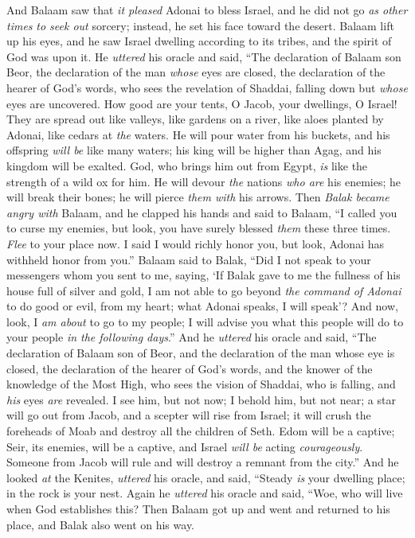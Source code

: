 \begin{biblechapter} %
 And Balaam saw that \textit{it pleased} Adonai to bless Israel, and he did not go \textit{as other times} \textit{to seek out} sorcery; instead, he set his face toward the desert.
\verse Balaam lift up his eyes, and he saw Israel dwelling according to its tribes, and the spirit of God was upon it.
\verse He \textit{uttered} his oracle and said,
\verse “The declaration of Balaam son Beor, 
the declaration of the man \textit{whose} eyes are closed,
\verse the declaration of the hearer of God’s words, 
who sees the revelation of Shaddai, 
falling down but \textit{whose} eyes are uncovered.
\verse How good are your tents, O Jacob, 
your dwellings, O Israel!
\verse They are spread out like valleys, 
like gardens on a river, 
like aloes planted by Adonai, 
like cedars at \textit{the} waters.
\verse He will pour water from his buckets, 
and his offspring \textit{will be} like many waters; 
his king will be higher than Agag, 
and his kingdom will be exalted.
\verse God, who brings him out from Egypt, 
\textit{is} like the strength of a wild ox for him. 
He will devour \textit{the} nations \textit{who are} his enemies; 
he will break their bones; 
he will pierce \textit{them with} his arrows.
\verse Then \textit{Balak became angry with} Balaam, and he clapped his hands and said to Balaam, “I called you to curse my enemies, but look, you have surely blessed \textit{them} these three times.
\verse \textit{Flee} to your place now. I said I would richly honor you, but look, Adonai has withheld honor from you.”
\verse Balaam said to Balak, “Did I not speak to your messengers whom you sent to me, saying,
\verse ‘If Balak gave to me the fullness of his house full of silver and gold, I am not able to go beyond \textit{the command of Adonai} to do good or evil, from my heart; what Adonai speaks, I will speak’?
\verse And now, look, I \textit{am about} to go to my people; I will advise you what this people will do to your people \textit{in the following days}.”
\verse And he \textit{uttered} his oracle and said,
\verse “The declaration of Balaam son of Beor, 
and the declaration of the man whose eye is closed,
\verse the declaration of the hearer of God’s words, 
and the knower of the knowledge of the Most High, 
who sees the vision of Shaddai, 
who is falling, and \textit{his} eyes \textit{are} revealed.
\verse I see him, but not now; 
I behold him, but not near; 
a star will go out from Jacob, 
and a scepter will rise from Israel; 
it will crush the foreheads of Moab 
and destroy all the children of Seth.
\verse Edom will be a captive; 
Seir, its enemies, will be a captive, 
and Israel \textit{will be} acting \textit{courageously}.
\verse Someone from Jacob will rule 
and will destroy a remnant from the city.”
\verse And he looked \textit{at} the Kenites, \textit{uttered} his oracle, and said,
\verse “Steady \textit{is} your dwelling place; 
in the rock is your nest.
\verse Again he \textit{uttered} his oracle and said,
\verse “Woe, who will live when God establishes this?
\verse Then Balaam got up and went and returned to his place, and Balak also went on his way.
\end{biblechapter}

